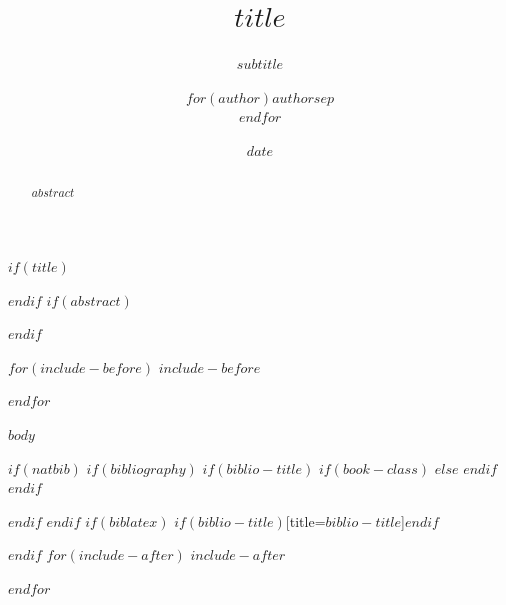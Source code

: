 \documentclass[$if(fontsize)$$fontsize$,$endif$$if(lang)$$babel-lang$,$endif$$if(papersize)$$papersize$paper,$endif$$for(classoption)$$classoption$$sep$,$endfor$]{$documentclass$}
\title{$title$}
\title{}
\subtitle{$subtitle$}
\author{$for(author)$$author$$sep$ \\ $endfor$}
\author{}
\date{$date$}
\date{}
\begin{document}
$if(title)$
\maketitle
$endif$
$if(abstract)$
\begin{abstract}
$abstract$
\end{abstract}
$endif$

$for(include-before)$
$include-before$

$endfor$

$body$

$if(natbib)$
$if(bibliography)$
$if(biblio-title)$
$if(book-class)$
\renewcommand\bibname{$biblio-title$}
$else$
\renewcommand\refname{$biblio-title$}
$endif$
$endif$


$endif$
$endif$
$if(biblatex)$
\printbibliography$if(biblio-title)$[title=$biblio-title$]$endif$

$endif$
$for(include-after)$
$include-after$

$endfor$
\end{document}
